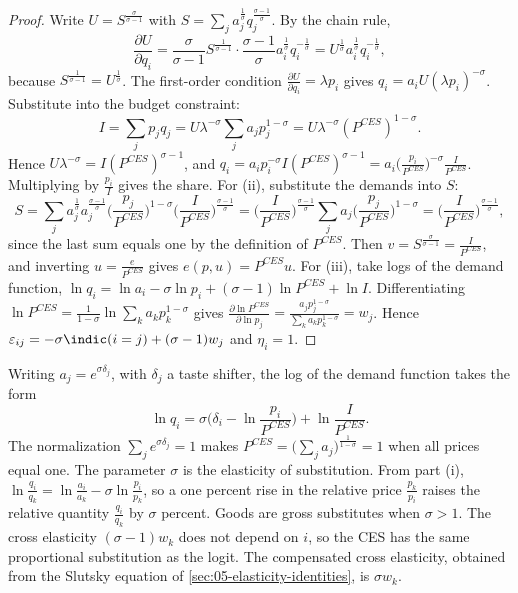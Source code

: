 \begin{proof}
Write $U = S^{\frac{\sigma}{\sigma-1}}$ with $S = \sum_j a_j^{\frac{1}{\sigma}}q_j^{\frac{\sigma-1}{\sigma}}$.
By the chain rule,
\begin{equation*}
\frac{\partial U}{\partial q_i} = \frac{\sigma}{\sigma-1}S^{\frac{1}{\sigma-1}}\cdot
\frac{\sigma-1}{\sigma}a_i^{\frac{1}{\sigma}}q_i^{-\frac{1}{\sigma}}
= U^{\frac{1}{\sigma}}a_i^{\frac{1}{\sigma}}q_i^{-\frac{1}{\sigma}},
\end{equation*}
because $S^{\frac{1}{\sigma-1}} = U^{\frac{1}{\sigma}}$. The first-order condition
$\frac{\partial U}{\partial q_i} = \lambda p_i$ gives $q_i = a_iU(\lambda p_i)^{-\sigma}$. Substitute into
the budget constraint:
\begin{equation*}
I = \sum_j p_jq_j = U\lambda^{-\sigma}\sum_j a_jp_j^{1-\sigma} = U\lambda^{-\sigma}(P^{CES})^{1-\sigma}.
\end{equation*}
Hence $U\lambda^{-\sigma} = I(P^{CES})^{\sigma-1}$, and
$q_i = a_ip_i^{-\sigma}I(P^{CES})^{\sigma-1} = a_i\big(\frac{p_i}{P^{CES}}\big)^{-\sigma}\frac{I}{P^{CES}}$.
Multiplying by $\frac{p_i}{I}$ gives the share. For (ii), substitute the demands into $S$:
\begin{equation*}
S = \sum_j a_j^{\frac{1}{\sigma}}a_j^{\frac{\sigma-1}{\sigma}}\Big(\frac{p_j}{P^{CES}}\Big)^{1-\sigma}
\Big(\frac{I}{P^{CES}}\Big)^{\frac{\sigma-1}{\sigma}}
= \Big(\frac{I}{P^{CES}}\Big)^{\frac{\sigma-1}{\sigma}}\sum_j a_j\Big(\frac{p_j}{P^{CES}}\Big)^{1-\sigma}
= \Big(\frac{I}{P^{CES}}\Big)^{\frac{\sigma-1}{\sigma}} ,
\end{equation*}
since the last sum equals one by the definition of $P^{CES}$. Then $v = S^{\frac{\sigma}{\sigma-1}} =
\frac{I}{P^{CES}}$, and inverting $u = \frac{e}{P^{CES}}$ gives $e(p,u) = P^{CES}u$. For (iii), take logs of
the demand function, $\ln q_i = \ln a_i - \sigma\ln p_i + (\sigma - 1)\ln P^{CES} + \ln I$. Differentiating
$\ln P^{CES} = \frac{1}{1-\sigma}\ln\sum_k a_kp_k^{1-\sigma}$ gives
$\frac{\partial\ln P^{CES}}{\partial\ln p_j} = \frac{a_jp_j^{1-\sigma}}{\sum_k a_kp_k^{1-\sigma}} = w_j$.
Hence $\varepsilon_{ij} = -\sigma\indic(i=j) + (\sigma - 1)w_j$ and $\eta_i = 1$.
\end{proof}

Writing $a_j = e^{\sigma\delta_j}$, with $\delta_j$ a taste shifter, the log of the demand function takes the
form
\begin{equation}\label{eq:05-ces}
\ln q_i = \sigma\Big(\delta_i - \ln\frac{p_i}{P^{CES}}\Big) + \ln\frac{I}{P^{CES}} .
\end{equation}
The normalization $\sum_j e^{\sigma\delta_j} = 1$ makes $P^{CES} = \bigl(\sum_j a_j\bigr)^{\frac{1}{1-\sigma}} = 1$
when all prices equal one. The parameter $\sigma$ is the elasticity of substitution.
From part (i), $\ln\frac{q_i}{q_k} = \ln\frac{a_i}{a_k} - \sigma\ln\frac{p_i}{p_k}$, so a one percent rise in
the relative price $\frac{p_k}{p_i}$ raises the relative quantity $\frac{q_i}{q_k}$ by $\sigma$ percent.
Goods are gross substitutes when $\sigma > 1$. The cross elasticity $(\sigma-1)w_k$ does not depend on $i$,
so the CES has the same proportional substitution as the logit. The compensated cross elasticity, obtained
from the Slutsky equation of \cref{sec:05-elasticity-identities}, is $\sigma w_k$.

